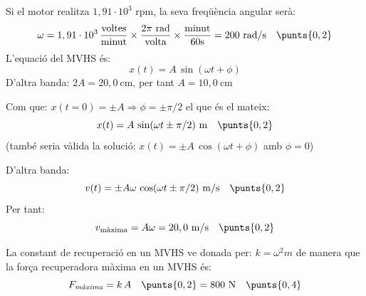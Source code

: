 \begin{solapartat}
Si el motor realitza $1,91\cdot 10^{3}$ rpm, la seva freqüència angular serà:
\[ \omega = 1,91\cdot 10^{3}\,\frac{\text{voltes}}{\text{minut}}\times\frac{2\pi\ \text{rad}}{\text{volta}}\times\frac{\text{minut}}{60\text{s}} = 200\ \mathrm{rad/s} \quad\punts{0,2} \]
L'equació del MVHS és:
\[ x(t) = A\,\sin(\omega t + \phi) \]
D'altra banda: $2A = 20,0\ \mathrm{cm}$, per tant $A = 10,0\ \mathrm{cm}$ \quad{}

Com que: $x(t = 0) = \pm A \Rightarrow \phi = \pm\pi/2$ el que és el mateix:
\[ x(t) = A\,\sin(\omega t \pm \pi/2)\ \mathrm{m} \quad\punts{0,2} \]
(també seria vàlida la solució: $x(t) = \pm A\,\cos(\omega t + \phi)$ amb $\phi = 0$)

D'altra banda:
\[ v(t) = \pm A\omega\,\cos(\omega t \pm \pi/2)\ \mathrm{m/s} \quad\punts{0,2} \]
Per tant:
\[ v_\text{màxima} = A\omega = 20,0\ \mathrm{m/s} \quad\punts{0,2} \]
\end{solapartat}

\begin{solapartat}
La constant de recuperació en un MVHS ve donada per: $k = \omega^2 m$ \quad{} de manera que la força recuperadora màxima en un MVHS és:
\[ F_\textit{màxima} = k\,A \quad\punts{0,2} = 800\ \mathrm{N} \quad\punts{0,4} \]
\end{solapartat}
